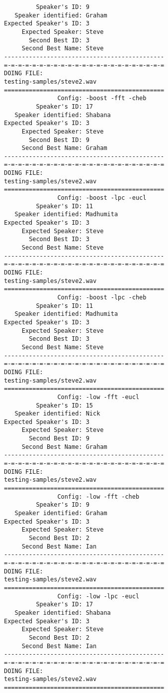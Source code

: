 \begin{verbatim}
         Speaker's ID: 9
   Speaker identified: Graham
Expected Speaker's ID: 3
     Expected Speaker: Steve
       Second Best ID: 3
     Second Best Name: Steve
---------------------------------------------
=-=-=-=-=-=-=-=-=-=-=-=-=-=-=-=-=-=-=-=-=-=-=
DOING FILE:
testing-samples/steve2.wav
=============================================
               Config: -boost -fft -cheb
         Speaker's ID: 17
   Speaker identified: Shabana
Expected Speaker's ID: 3
     Expected Speaker: Steve
       Second Best ID: 9
     Second Best Name: Graham
---------------------------------------------
=-=-=-=-=-=-=-=-=-=-=-=-=-=-=-=-=-=-=-=-=-=-=
DOING FILE:
testing-samples/steve2.wav
=============================================
               Config: -boost -lpc -eucl
         Speaker's ID: 11
   Speaker identified: Madhumita
Expected Speaker's ID: 3
     Expected Speaker: Steve
       Second Best ID: 3
     Second Best Name: Steve
---------------------------------------------
=-=-=-=-=-=-=-=-=-=-=-=-=-=-=-=-=-=-=-=-=-=-=
DOING FILE:
testing-samples/steve2.wav
=============================================
               Config: -boost -lpc -cheb
         Speaker's ID: 11
   Speaker identified: Madhumita
Expected Speaker's ID: 3
     Expected Speaker: Steve
       Second Best ID: 3
     Second Best Name: Steve
---------------------------------------------
=-=-=-=-=-=-=-=-=-=-=-=-=-=-=-=-=-=-=-=-=-=-=
DOING FILE:
testing-samples/steve2.wav
=============================================
               Config: -low -fft -eucl
         Speaker's ID: 15
   Speaker identified: Nick
Expected Speaker's ID: 3
     Expected Speaker: Steve
       Second Best ID: 9
     Second Best Name: Graham
---------------------------------------------
=-=-=-=-=-=-=-=-=-=-=-=-=-=-=-=-=-=-=-=-=-=-=
DOING FILE:
testing-samples/steve2.wav
=============================================
               Config: -low -fft -cheb
         Speaker's ID: 9
   Speaker identified: Graham
Expected Speaker's ID: 3
     Expected Speaker: Steve
       Second Best ID: 2
     Second Best Name: Ian
---------------------------------------------
=-=-=-=-=-=-=-=-=-=-=-=-=-=-=-=-=-=-=-=-=-=-=
DOING FILE:
testing-samples/steve2.wav
=============================================
               Config: -low -lpc -eucl
         Speaker's ID: 17
   Speaker identified: Shabana
Expected Speaker's ID: 3
     Expected Speaker: Steve
       Second Best ID: 2
     Second Best Name: Ian
---------------------------------------------
=-=-=-=-=-=-=-=-=-=-=-=-=-=-=-=-=-=-=-=-=-=-=
DOING FILE:
testing-samples/steve2.wav
=============================================

\end{verbatim}
